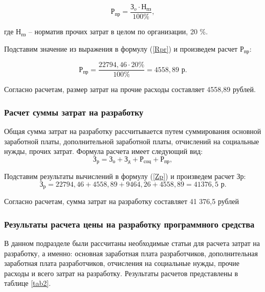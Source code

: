 \begin{equation}
\label{Rpr}
    \text{Р}_{\text{пр}} = \frac{\text{З}_{o} \cdot \text{Н}_{\text{пз}}}{100\%},
\end{equation}

где $\text{Н}_{\text{пз}}$ -- норматив прочих затрат в целом по организации, 20 \%.

Подставим значение из выражения в формулу (\ref{Rpr}) и произведем расчет $\text{Р}_{\text{пр}}$:

$$
 \text{Р}_{\text{пр}} = \frac{22794,46 \cdot 20\%}{100\%} = 4558,89 \text{ р.}
$$

Согласно расчетам, размер затрат на прочие расходы составляет
4558,89 рублей.

\subsubsection{Расчет суммы затрат на разработку}

Общая сумма затрат на разработку рассчитывается путем суммирования основной заработной платы, дополнительной заработной платы, отчислений на социальные нужды, прочих затрат. Формула расчета имеет следующий вид:
\begin{equation}
\label{Zp}
    \text{З}_{\text{р}} = \text{З}_{\text{о}} + \text{З}_{\text{д}} + \text{Р}_{\text{соц}} + \text{Р}_{\text{пр}},
\end{equation}


Подставим результаты вычислений в формулу (\ref{Zp}) и произведем расчет Зр:
$$
 \text{З}_{\text{р}} = 22794,46+4558,89 +9464,26+4558,89 = 41 376,5  \text{ р.}
$$

Согласно расчетам, сумма затрат на разработку составляет 41 376,5 рублей

\subsubsection{Результаты расчета цены на разработку программного средства}

В данном подразделе были рассчитаны необходимые статьи для расчета затрат на разработку, а именно: основная заработная плата разработчиков, дополнительная заработная плата разработчиков, отчисления на социальные нужды, прочие расходы и всего затрат на разработку. Результаты расчетов представлены в таблице \ref{tab2}.

